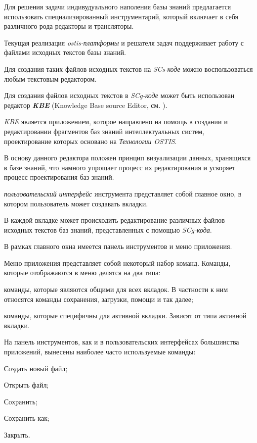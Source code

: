 Для решения задачи индивудуального наполения базы знаний предлагается использовать специализированный инструментарий, который включает в себя различного рода редакторы и трансляторы.

Текущая реализация \textit{ostis-платформы} и решателя задач поддерживает работу с файлами исходных текстов базы знаний.

Для создания таких файлов исходных текстов на \textit{SCs-коде} можно воспользоваться любым текстовым редактором.

Для создания файлов исходных текстов в \textit{SCg-коде} может быть использован редактор \textbf{\textit{KBE}} (Knowledge Base source Editor, см. ). 

\textit{KBE} является приложением, которое направлено на помощь в создании и редактировании фрагментов баз знаний интеллектуальных систем, проектирование которых основано на \textit{Технологии OSTIS}.

В основу данного редактора положен принцип визуализации данных, хранящихся в базе знаний, что намного упрощает процесс их редактирования и ускоряет процесс проектирования баз знаний.

\textit{пользовательский интерфейс} инструмента представляет собой главное окно, в котором пользователь может создавать вкладки.

В каждой вкладке может происходить редактирование различных файлов исходных текстов баз знаний, представленных с помощью \textit{SCg-кода}.

В рамках главного окна имеется панель инструментов и меню приложения. 

Меню приложения представляет собой некоторый набор команд. Команды, которые отображаются в меню делятся на два типа:
\begin{textitemize}
\item команды, которые являются общими для всех вкладок. В частности к ним относятся команды сохранения, загрузки, помощи и так далее;
\item команды, которые специфичны для активной вкладки. Зависят от типа активной вкладки.
\end{textitemize}

На панель инструментов, как и в пользовательских интерфейсах большинства приложений, вынесены наиболее часто используемые команды:
\begin{textitemize}
\item Создать новый файл;
\item Открыть файл;
\item Сохранить;
\item Сохранить как;
\item Закрыть.
\end{textitemize}

